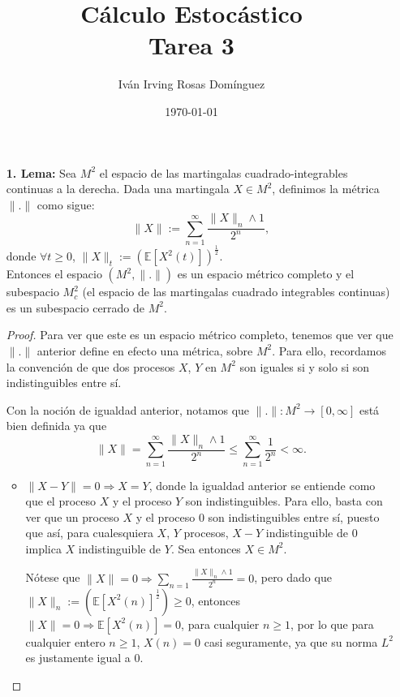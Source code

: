 \documentclass[letterpaper]{article}
\title{\textbf{Cálculo Estocástico\\
Tarea 3}}
\author{Iván Irving Rosas Domínguez}
\date{\today}
\renewcommand{\to}{\rightarrow}
\newcommand{\ent}{\Longrightarrow}
\newcommand{\E}{\mathbb{E}}
\newcommand{\1}{\mathds{1}}
\theoremstyle{definition}
\theoremstyle{definition}
\theoremstyle{definition}
\theoremstyle{definition}
\theoremstyle{definition}
\begin{document}
\maketitle

\begin{enumerate}
    \item[\textbf{1. Lema:}] Sea $M^2$ el espacio de las martingalas cuadrado-integrables continuas a la derecha. Dada una martingala $X\in M^2$, definimos la métrica $\|.\|$ como sigue: 
    \[
        \|X\|:=\sum_{n=1}^{\infty} \frac{\|X\|_n\wedge1}{2^n},
    \]
    donde $\forall t\geq0$, $\|X\|_t:=\left(\E\left[X^2(t)\right]\right)^{\frac{1}{2}}$.\\
    
    Entonces el espacio $\left(M^2,\|.\|\right)$ es un espacio métrico completo y el subespacio $M^2_c$ (el espacio de las martingalas cuadrado integrables continuas)
    es un subespacio cerrado de $M^2$.\\
    \begin{proof} 
       Para ver que este es un espacio métrico completo, tenemos que ver que $\|.\|$ anterior 
       define en efecto una métrica, sobre $M^2$. Para ello, recordamos la convención de que
       dos procesos $X$, $Y$ en $M^2$ son iguales si y solo si son indistinguibles entre sí.
       \newline

       Con la noción de igualdad anterior, notamos que $\| . \| : M^2\to [0,\infty]$ está bien 
       definida ya que 
       \[
       \|X\|= \sum_{n=1}^{\infty} \frac{\|X\|_n\wedge1}{2^n}\leq \sum_{n=1}^{\infty}\frac{1}{2^n}<\infty.
       \]
        
       \begin{itemize}
        \item $\|X-Y\|=0 \ent X=Y$, donde la igualdad anterior se entiende como que el proceso $X$ y el 
        proceso $Y$ son indistinguibles. Para ello, basta con ver que un proceso $X$ y el proceso $0$ son 
        indistinguibles entre sí, puesto que así, para cualesquiera $X$, $Y$ procesos, $X-Y$ indistinguible de
        $0$ implica $X$ indistinguible de $Y$. Sea entonces $X\in M^2$.
        \newline
        
        Nótese que $\|X\|=0 \ent \sum_{n=1}\frac{\|X\|_n\wedge1}{2^n}=0$,
        pero dado que $\|X\|_n:=\left(\E\left[X^2(n)\right]^{\frac{1}{2}}\right)\geq0$, 
        entonces $\|X\|=0 \ent \E\left[X^2(n)\right]=0$, para cualquier $n\geq1$, por lo que para
        cualquier entero $n\geq1$, $X(n)=0$ casi seguramente, ya que su norma $L^2$ es justamente
        igual a 0.\\
        

\end{itemize}
\end{proof}
\end{enumerate}
\end{document}
